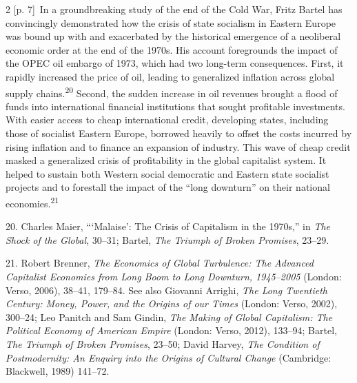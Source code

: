 \documentclass[10pt,a4paper]{article}
\begin{document}
\begin{paracol}{2}
{\scriptsize\color{gray} [p. 7]}\ In a groundbreaking study of the end of the Cold War, Fritz Bartel has convincingly demonstrated how the crisis of state socialism in Eastern Europe was bound up with and exacerbated by the historical emergence of a neoliberal economic order at the end of the 1970s. His account foregrounds the impact of the OPEC oil embargo of 1973, which had two long-term consequences. First, it rapidly increased the price of oil, leading to generalized inflation across global supply chains.\nobreak\textsuperscript{20} Second, the sudden increase in oil revenues brought a flood of funds into international financial institutions that sought profitable investments. With easier access to cheap international credit, developing states, including those of socialist Eastern Europe, borrowed heavily to offset the costs incurred by rising inflation and to finance an expansion of industry. This wave of cheap credit masked a generalized crisis of profitability in the global capitalist system. It helped to sustain both Western social democratic and Eastern state socialist projects and to forestall the impact of the “long downturn” on their national economies.\nobreak\textsuperscript{21}\par{\small 20. Charles Maier, “‘Malaise’: The Crisis of Capitalism in the 1970s,” in \textit{The Shock of the Global}, 30–31; Bartel, \textit{The Triumph of Broken Promises}, 23–29.\par}{\small 21. Robert Brenner, \textit{The Economics of Global Turbulence: The Advanced Capitalist Economies from Long Boom to Long Downturn, 1945–2005} (London: Verso, 2006), 38–41, 179–84. See also Giovanni Arrighi, \textit{The Long Twentieth Century: Money, Power, and the Origins of our Times} (London: Verso, 2002), 300–24; Leo Panitch and Sam Gindin, \textit{The Making of Global Capitalism: The Political Economy of American Empire} (London: Verso, 2012), 133–94; Bartel, \textit{The Triumph of Broken Promises}, 23–50; David Harvey, \textit{The Condition of Postmodernity: An Enquiry into the Origins of Cultural Change} (Cambridge: Blackwell, 1989) 141–72.\par}
\switchcolumn*

\end{paracol}
\end{document}
